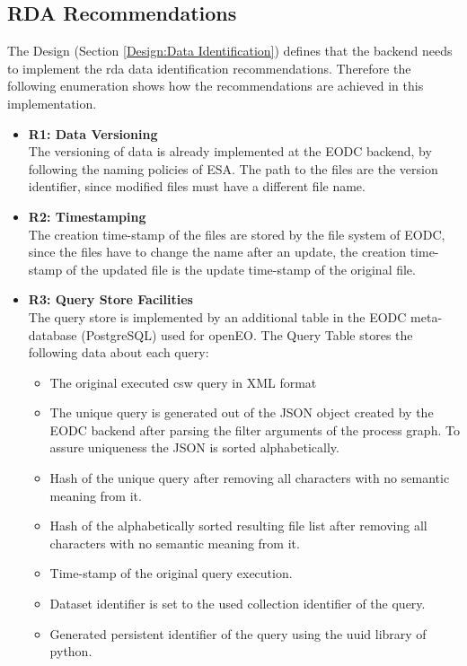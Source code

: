 \documentclass[draft,final]{vutinfth} %
\begin{document}
\subsection{RDA Recommendations}\label{Evaluation:dataidentification}
The Design (Section \ref{Design:Data Identification}) defines that the backend needs to implement the \acrshort{rda} data identification recommendations. Therefore the following enumeration shows how the recommendations are achieved in this implementation. 

\begin{itemize}
	\item \textbf{R1: Data Versioning} \\
	The versioning of data is already implemented at the EODC backend, by following the naming policies of ESA. The path to the files are the version identifier, since modified files must have a different file name.
	\item \textbf{R2: Timestamping} \\
	The creation time-stamp of the files are stored by the file system of EODC, since the files have to change the name after an update, the creation time-stamp of the updated file is the update time-stamp of the original file. 
	\item \textbf{R3: Query Store Facilities} \\
	The query store is implemented by an additional table in the EODC meta-database (PostgreSQL) used for openEO. The Query Table stores the following data about each query:
	\begin{itemize}
		\item The original executed \acrshort{csw} query in XML format
		\item The unique query is generated out of the JSON object created by the EODC backend after parsing the filter arguments of the process graph. To assure uniqueness the JSON is sorted alphabetically.
		\item Hash of the unique query after removing all characters with no semantic meaning from it.
		\item Hash of the alphabetically sorted resulting file list after removing all characters with no semantic meaning from it. 
		\item Time-stamp of the original query execution.
		\item Dataset identifier is set to the used collection identifier of the query.
		\item Generated persistent identifier of the query using the uuid library of python.

\end{itemize}
\end{itemize}
\end{document}
